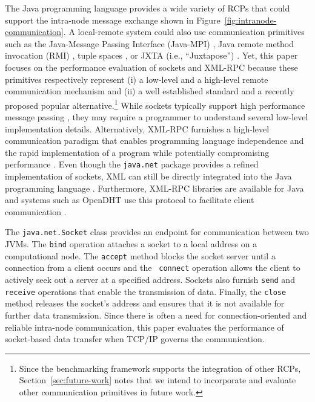 \documentclass{sig-alternate}
\begin{document}
The Java programming language provides a wide variety of RCPs that
could support the intra-node message exchange shown in
Figure~\ref{fig:intranode-communication}.  A local-remote system could
also use communication primitives such as the Java-Message Passing
Interface (Java-MPI) \cite{getov-mpi,judd-mpi-java}, Java remote
method invocation (RMI) \cite{grosso-rmi,maasen-java-rmi}, tuple
spaces \cite{arnold-javaspace-rdb,wells-linda-java-journal}, or JXTA
(i.e., ``Juxtapose'') \cite{oaks-jxta,seigneur-jxta}.  Yet, this paper
focuses on the performance evaluation of sockets and XML-RPC because
these primitives respectively represent (i) a low-level and a
high-level remote communication mechanism and (ii) a well established
standard and a recently proposed popular alternative.\footnote{{\small
    Since the benchmarking framework supports the integration of other
    RCPs, Section~\ref{sec:future-work} notes that we intend to
    incorporate and evaluate other communication primitives in future
    work.}} While sockets typically support high performance message
passing \cite{allman-per}, they may require a programmer to understand
several low-level implementation details.  Alternatively, XML-RPC
furnishes a high-level communication paradigm that enables programming
language independence and the rapid implementation of a program while
potentially compromising performance \cite{allman-per}.  Even though
the {\tt java.net} package provides a refined implementation of
sockets, XML can still be directly integrated into the Java
programming language \cite{harren-xj}.  Furthermore, XML-RPC libraries
are available for Java and systems such as OpenDHT use this protocol
to facilitate client communication \cite{rhea-opendht}.

The {\tt java.net.Socket} class provides an endpoint for communication
between two JVMs.  The {\tt bind} operation attaches a socket to a
local address on a computational node.  The {\tt accept} method blocks
the socket server until a connection from a client occurs and the {\tt
  connect} operation allows the client to actively seek out a server
at a specified address.  Sockets also furnish {\tt send} and {\tt
  receive} operations that enable the transmission of data.  Finally,
the {\tt close} method releases the socket's address and ensures that
it is not available for further data transmission.  Since there is
often a need for connection-oriented and reliable intra-node
communication, this paper evaluates the performance of socket-based
data transfer when TCP/IP governs the communication.
\end{document}
